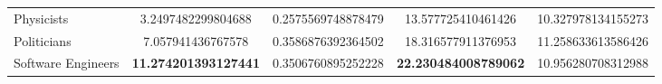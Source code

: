 {\begin{tabular}{lSSSS}
    Physicists           & 3.2497482299804688                                 & 0.2575569748878479                                 & 13.577725410461426                                 & 10.327978134155273                                 \\
    Politicians          & 7.057941436767578                                  & 0.3586876392364502                                 & 18.316577911376953                                 & 11.258633613586426                                 \\
    Software Engineers   &  \bfseries 11.274201393127441 & 0.3506760895252228                                 &  \bfseries 22.230484008789062 & 10.956280708312988                                 \\
    \bottomrule
  \end{tabular}
}

